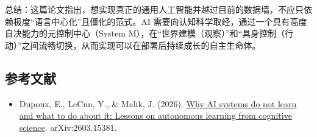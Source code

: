 总结：这篇论文指出，想实现真正的通用人工智能并越过目前的数据墙，不应只依赖极度``语言中心化''且僵化的范式。AI 需要向认知科学取经，通过一个具有高度自决能力的元控制中心（System M），在``世界建模（观察）''和``具身控制（行动）''之间流畅切换，从而实现可以在部署后持续成长的自主生命体。

\hypertarget{ux53c2ux8003ux6587ux732e-153}{%
\subsection{参考文献}\label{ux53c2ux8003ux6587ux732e-153}}

\begin{itemize}
\tightlist
\item
  Dupoux, E., LeCun, Y., \& Malik, J. (2026). \href{https://arxiv.org/abs/2603.15381}{Why AI systems do not learn and what to do about it: Lessons on autonomous learning from cognitive science}. arXiv:2603.15381.
\end{itemize}

\clearpage
